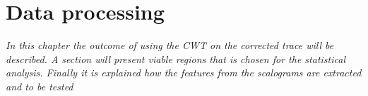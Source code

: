 \chapter{Data processing}
\textit{In this chapter the outcome of using the CWT on the corrected trace will be described. A section will present viable regions that is chosen for the statistical analysis. Finally it is explained how the features from the scalograms are extracted and to be tested } 